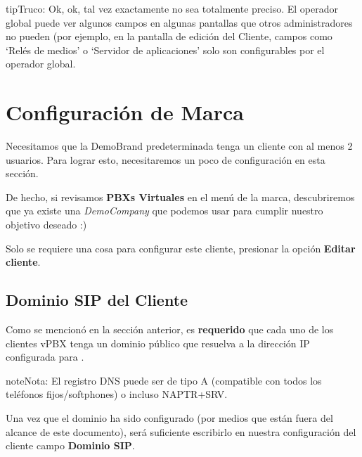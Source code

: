 \documentclass[letterpaper,10pt,spanish]{sphinxmanual}
\begin{document}
\begin{notice}{tip}{Truco:}
Ok, ok, tal vez exactamente no sea totalmente preciso. El operador global puede ver algunos campos en algunas pantallas que otros administradores no pueden (por ejemplo, en la pantalla de edición del Cliente, campos como `Relés de medios' o `Servidor de aplicaciones' solo son configurables por el operador global.
\end{notice}


\section{Configuración de Marca}
\label{getting_started/internal_calls/brand_portal::doc}\label{getting_started/internal_calls/brand_portal:brand-configuration}\label{getting_started/internal_calls/brand_portal:id1}
Necesitamos que la DemoBrand predeterminada tenga un cliente con al menos 2 usuarios. Para lograr esto, necesitaremos un poco de configuración en esta sección.

De hecho, si revisamos \textbf{PBXs Virtuales} en el menú de la marca, descubriremos que ya existe una \emph{DemoCompany} que podemos usar para cumplir nuestro objetivo deseado :)

Solo se requiere una cosa para configurar este cliente, presionar la opción \textbf{Editar cliente}.
\label{getting_started/internal_calls/brand_portal:domain-per-client}

\subsection{Dominio SIP del Cliente}
\label{getting_started/internal_calls/brand_portal:domain-per-client}\label{getting_started/internal_calls/brand_portal:id2}\label{getting_started/internal_calls/brand_portal:client-sip-domain}
Como se mencionó en la sección anterior, es \textbf{requerido} que cada uno de los clientes vPBX tenga un dominio público que resuelva a la dirección IP configurada para {\hyperref[administration_portal/platform/infrastructure/proxy_users:proxyusers]{}}.

\begin{notice}{note}{Nota:}
El registro DNS puede ser de tipo A (compatible con todos los teléfonos fijos/softphones) o incluso NAPTR+SRV.
\end{notice}

Una vez que el dominio ha sido configurado (por medios que están fuera del alcance de este documento), será suficiente escribirlo en nuestra configuración del cliente campo \textbf{Dominio SIP}.
\end{document}
